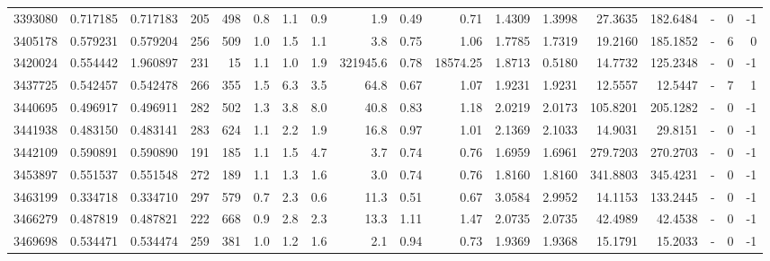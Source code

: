 \begin{tabular}{rrrrrrrrrrrrrrrlrr}
   3393080 & 0.717185 &   0.717183 &  205 &  498 &      0.8 &      1.1 &     0.9 &      1.9 &       0.49 &        0.71 &  1.4309 &  1.3998 &   27.3635 &  182.6484 &             - &        0 &         -1 \\
   3405178 & 0.579231 &   0.579204 &  256 &  509 &      1.0 &      1.5 &     1.1 &      3.8 &       0.75 &        1.06 &  1.7785 &  1.7319 &   19.2160 &  185.1852 &             - &        6 &          0 \\
   3420024 & 0.554442 &   1.960897 &  231 &   15 &      1.1 &      1.0 &     1.9 & 321945.6 &       0.78 &    18574.25 &  1.8713 &  0.5180 &   14.7732 &  125.2348 &             - &        0 &         -1 \\
   3437725 & 0.542457 &   0.542478 &  266 &  355 &      1.5 &      6.3 &     3.5 &     64.8 &       0.67 &        1.07 &  1.9231 &  1.9231 &   12.5557 &   12.5447 &             - &        7 &          1 \\
   3440695 & 0.496917 &   0.496911 &  282 &  502 &      1.3 &      3.8 &     8.0 &     40.8 &       0.83 &        1.18 &  2.0219 &  2.0173 &  105.8201 &  205.1282 &             - &        0 &         -1 \\
   3441938 & 0.483150 &   0.483141 &  283 &  624 &      1.1 &      2.2 &     1.9 &     16.8 &       0.97 &        1.01 &  2.1369 &  2.1033 &   14.9031 &   29.8151 &             - &        0 &         -1 \\
   3442109 & 0.590891 &   0.590890 &  191 &  185 &      1.1 &      1.5 &     4.7 &      3.7 &       0.74 &        0.76 &  1.6959 &  1.6961 &  279.7203 &  270.2703 &             - &        0 &         -1 \\
   3453897 & 0.551537 &   0.551548 &  272 &  189 &      1.1 &      1.3 &     1.6 &      3.0 &       0.74 &        0.76 &  1.8160 &  1.8160 &  341.8803 &  345.4231 &             - &        0 &         -1 \\
   3463199 & 0.334718 &   0.334710 &  297 &  579 &      0.7 &      2.3 &     0.6 &     11.3 &       0.51 &        0.67 &  3.0584 &  2.9952 &   14.1153 &  133.2445 &             - &        0 &         -1 \\
   3466279 & 0.487819 &   0.487821 &  222 &  668 &      0.9 &      2.8 &     2.3 &     13.3 &       1.11 &        1.47 &  2.0735 &  2.0735 &   42.4989 &   42.4538 &             - &        0 &         -1 \\
   3469698 & 0.534471 &   0.534474 &  259 &  381 &      1.0 &      1.2 &     1.6 &      2.1 &       0.94 &        0.73 &  1.9369 &  1.9368 &   15.1791 &   15.2033 &             - &        0 &         -1 \\

\end{tabular}
